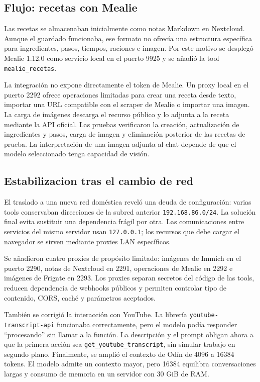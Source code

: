 \subsection{Flujo: recetas con Mealie}
Las recetas se almacenaban inicialmente como notas Markdown en Nextcloud. Aunque el guardado funcionaba, ese formato no ofrecía una estructura específica para ingredientes, pasos, tiempos, raciones e imagen. Por este motivo se desplegó Mealie 1.12.0 como servicio local en el puerto 9925 y se añadió la tool \texttt{mealie\_recetas}.

La integración no expone directamente el token de Mealie. Un proxy local en el puerto 2292 ofrece operaciones limitadas para crear una receta desde texto, importar una URL compatible con el scraper de Mealie o importar una imagen. La carga de imágenes descarga el recurso público y lo adjunta a la receta mediante la API oficial. Las pruebas verificaron la creación, actualización de ingredientes y pasos, carga de imagen y eliminación posterior de las recetas de prueba. La interpretación de una imagen adjunta al chat depende de que el modelo seleccionado tenga capacidad de visión.


\subsection{Estabilizacion tras el cambio de red}
El traslado a una nueva red doméstica reveló una deuda de configuración: varias tools conservaban direcciones de la subred anterior \texttt{192.168.86.0/24}. La solución final evita sustituir una dependencia frágil por otra. Las comunicaciones entre servicios del mismo servidor usan \texttt{127.0.0.1}; los recursos que debe cargar el navegador se sirven mediante proxies LAN específicos.

Se añadieron cuatro proxies de propósito limitado: imágenes de Immich en el puerto 2290, notas de Nextcloud en 2291, operaciones de Mealie en 2292 e imágenes de Frigate en 2293. Los proxies separan secretos del código de las tools, reducen dependencia de webhooks públicos y permiten controlar tipo de contenido, CORS, caché y parámetros aceptados.

También se corrigió la interacción con YouTube. La librería \texttt{youtube-transcript-api} funcionaba correctamente, pero el modelo podía responder ``procesando'' sin llamar a la función. La descripción y el prompt obligan ahora a que la primera acción sea \texttt{get\_youtube\_transcript}, sin simular trabajo en segundo plano. Finalmente, se amplió el contexto de Odín de 4096 a 16384 tokens. El modelo admite un contexto mayor, pero 16384 equilibra conversaciones largas y consumo de memoria en un servidor con 30 GiB de RAM.

